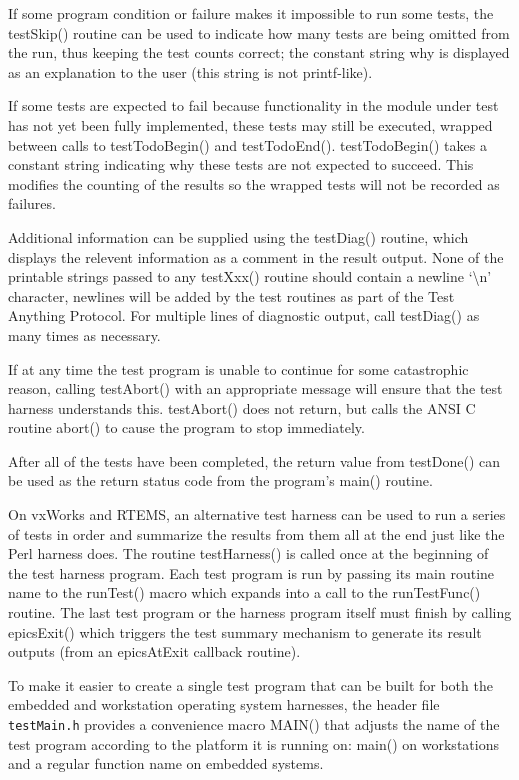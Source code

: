 If some program condition or failure makes it impossible to run some tests, the testSkip() routine can be used to indicate how many tests are being omitted from the run, thus keeping the test counts correct; the constant string why is displayed as an explanation to the user (this string is not printf-like).

If some tests are expected to fail because functionality in the module under test has not yet been fully implemented, these tests may still be executed, wrapped between calls to testTodoBegin() and testTodoEnd().
testTodoBegin() takes a constant string indicating why these tests are not expected to succeed.
This modifies the counting of the results so the wrapped tests will not be recorded as failures.

Additional information can be supplied using the testDiag() routine, which displays the relevent information as a comment in the result output.
None of the printable strings passed to any testXxx() routine should contain a newline `\textbackslash{}n' character, newlines will be added by the test routines as part of the Test Anything Protocol.
For multiple lines of diagnostic output, call testDiag() as many times as necessary.

If at any time the test program is unable to continue for some catastrophic reason, calling testAbort() with an appropriate message will ensure that the test harness understands this. testAbort() does not return, but calls the ANSI C routine abort() to cause the program to stop immediately.

After all of the tests have been completed, the return value from testDone() can be used as the return status code from the program's main() routine.

On vxWorks and RTEMS, an alternative test harness can be used to run a series of tests in order and summarize the results from them all at the end just like the Perl harness does.
The routine testHarness() is called once at the beginning of the test harness program.
Each test program is run by passing its main routine name to the runTest() macro which expands into a 
call to the runTestFunc() routine.
The last test program or the harness program itself must finish by calling epicsExit() which triggers the test summary mechanism to generate its result outputs (from an epicsAtExit callback routine).

To make it easier to create a single test program that can be built for both the embedded and workstation operating system harnesses, the header file \verb|testMain.h| provides a convenience macro MAIN() that adjusts the name of the test program according to the platform it is running on: main() on workstations and a regular function name on embedded systems.

